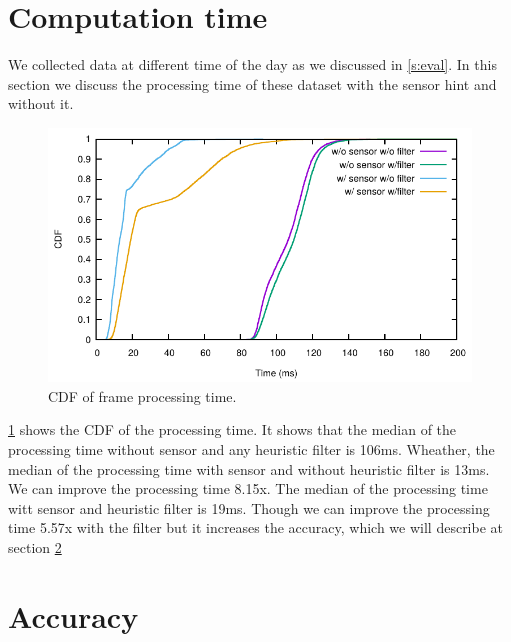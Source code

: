 \section{Computation time}
We collected data at different time of the day as we discussed in \ref{s:eval}.
In this section we discuss the processing time of these dataset with the sensor hint and without it.

\begin{figure}[h!]
\centering
\includegraphics[width=5.2in]{plots/walk_cdf_time.pdf}
\caption{CDF of frame processing time.}
\label{f:cdf_time}
\end{figure}


\ref{f:cdf_time} shows the CDF of the processing time.
It shows that the median of the processing time without sensor and any heuristic filter is 106ms.
Wheather, the median of the processing time with sensor and without heuristic filter is 13ms.
We can improve the processing time 8.15x.
The median of the processing time witt sensor and heuristic filter is 19ms.
Though we can improve the processing time 5.57x with the filter but it increases the accuracy, which we will describe at section \ref{s:acc}

\section{Accuracy}
\label{s:acc}


